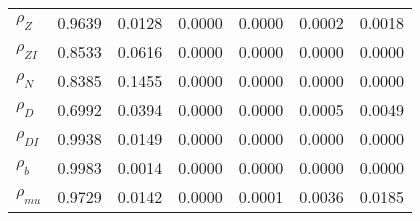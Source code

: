 \begin{center}
\begin{longtable}{lcccccc}
$ {\rho_Z}             $	 & 	          0.9639	 & 	          0.0128	 & 	          0.0000	 & 	          0.0000	 & 	          0.0002	 & 	          0.0018 \\ 
$ {\rho_{ZI}}          $	 & 	          0.8533	 & 	          0.0616	 & 	          0.0000	 & 	          0.0000	 & 	          0.0000	 & 	          0.0000 \\ 
$ {\rho_N}             $	 & 	          0.8385	 & 	          0.1455	 & 	          0.0000	 & 	          0.0000	 & 	          0.0000	 & 	          0.0000 \\ 
$ {\rho_D}             $	 & 	          0.6992	 & 	          0.0394	 & 	          0.0000	 & 	          0.0000	 & 	          0.0005	 & 	          0.0049 \\ 
$ {\rho_{DI}}          $	 & 	          0.9938	 & 	          0.0149	 & 	          0.0000	 & 	          0.0000	 & 	          0.0000	 & 	          0.0000 \\ 
$ {\rho_b}             $	 & 	          0.9983	 & 	          0.0014	 & 	          0.0000	 & 	          0.0000	 & 	          0.0000	 & 	          0.0000 \\ 
$ {\rho_{mu}}          $	 & 	          0.9729	 & 	          0.0142	 & 	          0.0000	 & 	          0.0001	 & 	          0.0036	 & 	          0.0185 \\ 
\end{longtable}
 \end{center}
